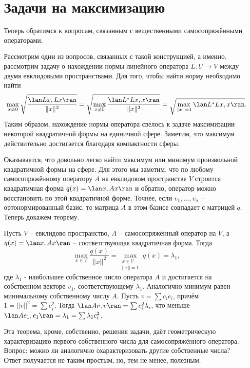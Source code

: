 \section{Задачи на максимизацию}

Теперь обратимся к вопросам, связанным с вещественными самосопряжёнными операторами.

Рассмотрим один из вопросов, связанных с такой конструкцией, а именно, рассмотрим задачу о нахождении нормы линейного оператора $L \colon U \to V$ между двумя евклидовыми пространствами. Для того, чтобы найти  норму необходимо найти
$$\max_{x\neq 0}\sqrt{\frac{\lan Lx,Lx\ran}{\|x\|^2}}=\sqrt{\max_{x\neq 0}\frac{\lan L^*Lx,x\ran}{\|x\|^2}}=\sqrt{\max_{\|x\|=1} \lan L^*Lx,x\ran}.$$
Таким образом, нахождение нормы оператора свелось к задаче максимизации некоторой квадратичной формы на единичной сфере. Заметим, что максимум действительно достигается благодаря компактности сферы.

Оказывается, что довольно легко найти максимум или минимум произвольной квадратичной формы на сфере. Для этого мы заметим, что по любому самосопряжённому оператору $A$ на евклидовом пространстве $V$ строится квадратичная форма $q(x)=\lan x, Ax\ran$ и обратно, оператор можно восстановить по этой квадратичной форме. Точнее, если $v_1,\dots,v_n$ -- ортонормированный базис, то матрица $A$ в этом базисе совпадает с матрицей $q$. Теперь докажем теорему.



\thrm Пусть $V$ -- евклидово пространство, $A$ -- самосопряжённый оператор на $V$, а $q(x)=\lan x,Ax\ran$ -- соответствующая квадратичная форма. Тогда 
$$\max_{ x\in V } \frac{q(x)}{||x||^2}=\max_{\substack{ x\in V \\ ||x||=1}} q(x)=\lambda_1,$$
где $\lambda_1$ - наибольшее собственное число оператора $A$ и достигается на собственном векторе $v_1$, соответствующему $\lambda_1$. Аналогично минимум равен минимальному собственному числу $A$. 
\proof
Пусть $v=\sum c_i e_i$, причём $1=||v||^2=\sum c_i^2$. Тогда $\lan Av,v\ran = \sum c^2_i \lambda_i $, что меньше $\lan A e_1,e_1\ran= \lambda_1= \sum \lambda_1 c_i^2$.
\endproof
\ethrm

Эта теорема, кроме, собственно, решения задачи, даёт геометрическую характеризацию первого собственного числа для самосопряжённого оператора. Вопрос: можно ли аналогично охарактеризовать другие собственные числа? Ответ получается не таким простым, но, тем не менее, полезным.

